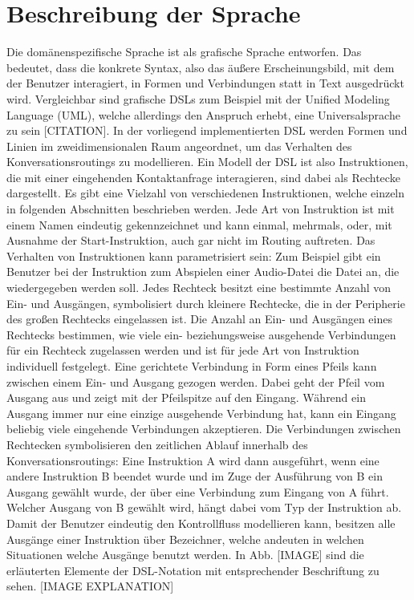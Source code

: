 \section{Beschreibung der Sprache}
Die domänenspezifische Sprache ist als grafische Sprache entworfen. Das bedeutet, dass die konkrete Syntax, also das äußere Erscheinungsbild, mit dem der Benutzer interagiert, in Formen und Verbindungen statt in Text ausgedrückt wird. Vergleichbar sind grafische DSLs zum Beispiel mit der Unified Modeling Language (UML), welche allerdings den Anspruch erhebt, eine Universalsprache zu sein [CITATION].
\newline 
In der vorliegend implementierten DSL werden Formen und Linien im zweidimensionalen Raum angeordnet, um das Verhalten des Konversationsroutings zu modellieren. Ein Modell der DSL ist also Instruktionen, die mit einer eingehenden Kontaktanfrage interagieren, sind dabei als Rechtecke dargestellt. Es gibt eine Vielzahl von verschiedenen Instruktionen, welche einzeln in folgenden Abschnitten beschrieben werden. Jede Art von  Instruktion ist mit einem Namen eindeutig gekennzeichnet und kann einmal, mehrmals, oder, mit Ausnahme der Start-Instruktion, auch gar nicht im Routing auftreten. Das Verhalten von Instruktionen kann parametrisiert sein: Zum Beispiel gibt ein Benutzer bei der Instruktion zum Abspielen einer Audio-Datei die Datei an, die wiedergegeben werden soll. Jedes Rechteck besitzt eine bestimmte Anzahl von Ein- und Ausgängen, symbolisiert durch kleinere Rechtecke, die in der Peripherie des großen Rechtecks eingelassen ist. Die Anzahl an Ein- und Ausgängen eines Rechtecks bestimmen, wie viele ein- beziehungsweise ausgehende Verbindungen für ein Rechteck zugelassen werden und ist für jede Art von Instruktion individuell festgelegt. Eine gerichtete Verbindung in Form eines Pfeils kann zwischen einem Ein- und Ausgang gezogen werden. Dabei geht der Pfeil vom Ausgang aus und zeigt mit der Pfeilspitze auf den Eingang. Während ein Ausgang immer nur eine einzige ausgehende Verbindung hat, kann ein Eingang beliebig viele eingehende Verbindungen akzeptieren. Die Verbindungen zwischen Rechtecken symbolisieren den zeitlichen Ablauf innerhalb des Konversationsroutings: Eine Instruktion A wird dann ausgeführt, wenn eine andere Instruktion B beendet wurde und im Zuge der Ausführung von B ein Ausgang gewählt wurde, der über eine Verbindung zum Eingang von A führt. Welcher Ausgang von B gewählt wird, hängt dabei vom Typ der Instruktion ab. Damit der Benutzer eindeutig den Kontrollfluss modellieren kann, besitzen alle Ausgänge einer Instruktion über Bezeichner, welche andeuten in welchen Situationen welche Ausgänge benutzt werden.  In Abb. [IMAGE] sind die erläuterten Elemente der DSL-Notation mit entsprechender Beschriftung zu sehen. [IMAGE EXPLANATION]

